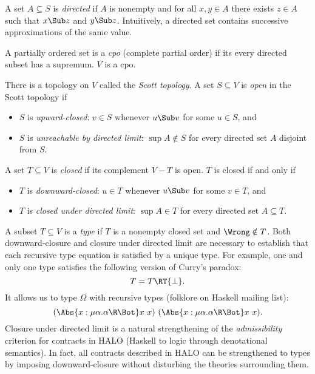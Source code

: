 \documentclass{amsart}
\theoremstyle{definition}
\begin{document}
A set $A\subseteq S$ is \emph{directed} if $A$ is nonempty and
for all $x,y\in A$ there exists $z\in A$ such that $x\Sub z$ and
$y\Sub z$. Intuitively, a directed set contains successive
approximations of the same value.

A partially ordered set is a \emph{cpo} (complete partial order)
if its every directed subset has a supremum. $V$ is a cpo.

\begin{samepage}
There is a topology on $V$ called the \emph{Scott topology}.
A set $S\subseteq V$ is \emph{open} in the Scott topology if
\begin{itemize}
\item $S$ is \emph{upward-closed}: $v\in S$ whenever $u\Sub v$
for some $u\in S$, and
\item $S$ is \emph{unreachable by directed limit}: $\sup A\notin
S$ for every directed set $A$ disjoint from $S$.
\end{itemize}
\end{samepage}

\begin{samepage}
A set $T\subseteq V$ is \emph{closed} if its complement $V-T$ is
open. $T$ is closed if and only if
\begin{itemize}
\item $T$ is \emph{downward-closed}: $u\in T$ whenever $u\Sub v$
for some $v\in T$, and
\item $T$ is \emph{closed under directed limit}: $\sup A\in T$
for every directed set $A\subseteq T$.
\end{itemize}
\end{samepage}

A subset $T\subseteq V$ is a \emph{type} if $T$ is a nonempty
closed set and $\Wrong\notin T$. Both downward-closure and
closure under directed limit are necessary to establish that each
recursive type equation is satisfied by a unique type. For
example, one and only one type satisfies the following version of
Curry's paradox:
\[
T=T\RT \{\bot\}.
\]
It allows us to type $\Omega$ with recursive types (folklore on
Haskell mailing list):
\[
(\Abs{x : \mu\alpha. \alpha\R\Bot}x~x)~
(\Abs{x : \mu\alpha. \alpha\R\Bot}x~x).
\]
Closure under directed limit is a natural strengthening of the
\emph{admissibility} criterion for contracts in HALO (Haskell to
logic through denotational semantics). In fact, all contracts
described in HALO can be strengthened to types by imposing
downward-closure without disturbing the theories surrounding
them.
\end{document}
